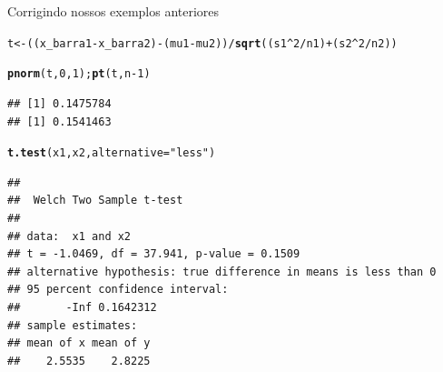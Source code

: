 \documentclass{beamer}\usepackage[]{graphicx}\usepackage[]{color}
\makeatletter
\newcommand{\hlnum}[1]{\textcolor[rgb]{0.686,0.059,0.569}{#1}}%
\newcommand{\hlstr}[1]{\textcolor[rgb]{0.192,0.494,0.8}{#1}}%
\newcommand{\hlopt}[1]{\textcolor[rgb]{0,0,0}{#1}}%
\newcommand{\hlstd}[1]{\textcolor[rgb]{0.345,0.345,0.345}{#1}}%
\newcommand{\hlkwb}[1]{\textcolor[rgb]{0.69,0.353,0.396}{#1}}%
\newcommand{\hlkwc}[1]{\textcolor[rgb]{0.333,0.667,0.333}{#1}}%
\newcommand{\hlkwd}[1]{\textcolor[rgb]{0.737,0.353,0.396}{\textbf{#1}}}%
\newenvironment{kframe}{%
 \def\at@end@of@kframe{}%
 \ifinner\ifhmode%
  \def\at@end@of@kframe{\end{minipage}}%
  \begin{minipage}{\columnwidth}%
 \fi\fi%
 \def\FrameCommand##1{\hskip\@totalleftmargin \hskip-\fboxsep
 \colorbox{shadecolor}{##1}\hskip-\fboxsep
     \hskip-\linewidth \hskip-\@totalleftmargin \hskip\columnwidth}%
 \MakeFramed {\advance\hsize-\width
   \@totalleftmargin\z@ \linewidth\hsize
   \@setminipage}}%
 {\par\unskip\endMakeFramed%
 \at@end@of@kframe}
\newenvironment{knitrout}{}{} %
\renewenvironment{knitrout}{\setlength{\topsep}{0mm}}{}
\makeatother
\begin{document}
\begin{frame}[fragile]{Corrigindo nossos exemplos anteriores}

\begin{knitrout}\tiny
{}\color{fgcolor}\begin{kframe}
\begin{alltt}
\hlstd{t} \hlkwb{<-} \hlstd{((x_barra1}\hlopt{-}\hlstd{x_barra2)}\hlopt{-}\hlstd{(mu1}\hlopt{-}\hlstd{mu2))}\hlopt{/}\hlkwd{sqrt}\hlstd{((s1}\hlopt{^}\hlnum{2}\hlopt{/}\hlstd{n1)}\hlopt{+}\hlstd{(s2}\hlopt{^}\hlnum{2}\hlopt{/}\hlstd{n2))}

\hlkwd{pnorm}\hlstd{(t,}\hlnum{0}\hlstd{,}\hlnum{1}\hlstd{);} \hlkwd{pt}\hlstd{(t,n}\hlopt{-}\hlnum{1}\hlstd{)}
\end{alltt}
\begin{verbatim}
## [1] 0.1475784
## [1] 0.1541463
\end{verbatim}
\begin{alltt}
\hlkwd{t.test}\hlstd{(x1,x2,} \hlkwc{alternative}\hlstd{=}\hlstr{"less"}\hlstd{)}
\end{alltt}
\begin{verbatim}
## 
## 	Welch Two Sample t-test
## 
## data:  x1 and x2
## t = -1.0469, df = 37.941, p-value = 0.1509
## alternative hypothesis: true difference in means is less than 0
## 95 percent confidence interval:
##       -Inf 0.1642312
## sample estimates:
## mean of x mean of y 
##    2.5535    2.8225
\end{verbatim}
\end{kframe}
\end{knitrout}

\end{frame} 
\end{document}

